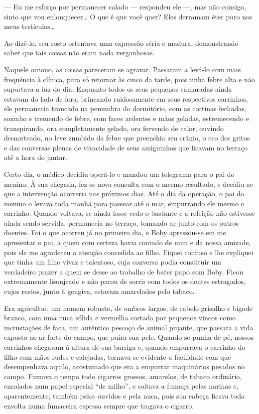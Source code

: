 
--- Eu me esforço por permanecer calado --- respondeu ele ---, mas não
consigo, sinto que vou enlouquecer\ldots{} O que é que você quer? Eles
derramam éter puro nos meus testículos\ldots{}

Ao dizê-lo, seu rosto ostentava uma expressão séria e madura,
demonstrando saber que tais coisas não eram nada vergonhosas.

Naquele outono, as coisas pareceram se agravar. Passaram a levá-lo com
mais frequência à clínica, para só retornar às cinco da tarde, pois
tinha febre alta e não suportava a luz do dia. Enquanto todos os seus
pequenos camaradas ainda estavam do lado de fora, brincando ruidosamente
em seus respectivos carrinhos, ele permanecia trancado na penumbra do
dormitório, com as cortinas fechadas, sozinho e tremendo de febre, com
faces ardentes e mãos geladas, estremecendo e transpirando, ora
completamente gelado, ora fervendo de calor, ouvindo desnorteado, no
leve zumbido da febre que preenchia seu crânio, o eco dos gritos e das
conversas plenas de vivacidade de seus amiguinhos que ficavam no terraço
até a hora do jantar.

Certo dia, o médico decidiu operá-lo e mandou um telegrama para o pai do
menino. À sua chegada, fez-se nova consulta com o mesmo resultado, e
decidiu-se que a intervenção ocorreria nos próximos dias. Até o dia da
operação, o pai do menino o levava toda manhã para passear até o mar,
empurrando ele mesmo o carrinho. Quando voltava, se ainda fosse cedo o
bastante e a refeição não estivesse ainda sendo servida, permanecia no
terraço, tomando ar junto com os outros doentes. Foi o que ocorreu já no
primeiro dia, e Boby apressou-se em me apresentar o pai, a quem com
certeza havia contado de mim e da nossa amizade, pois ele me agradeceu a
atenção concedida ao filho. Fiquei confuso e lhe expliquei que tinha um
filho vivaz e talentoso, cuja conversa podia constituir um verdadeiro
prazer a quem se desse ao trabalho de bater papo com Boby. Ficou
extremamente lisonjeado e não parou de sorrir com todos os dentes
estragados, cujos restos, junto à gengiva, estavam amarelados pelo
tabaco.

Era agricultor, um homem robusto, de ombros largos, de cabelo grisalho e
bigode branco, com uma nuca sólida e vermelha cortada por pequenos
vincos como incrustações de faca, um autêntico pescoço de animal
pujante, que passara a vida exposto ao ar forte do campo, que puíra sua
pele. Quando se punha de pé, nossos carrinhos chegavam à altura de sua
barriga e, quando empurrava o carrinho do filho com mãos rudes e
calejadas, tornava-se evidente a facilidade com que desempenhava aquilo,
acostumado que era a empurrar maquinários pesados no campo. Fumava o
tempo todo cigarros grossos, amarelos, de tabaco ordinário, enrolados
num papel especial ``de milho'', e soltava a fumaça pelas narinas e,
aparentemente, também pelos ouvidos e pela nuca, pois sua cabeça ficava
toda envolta numa fumaceira espessa sempre que tragava o cigarro.

